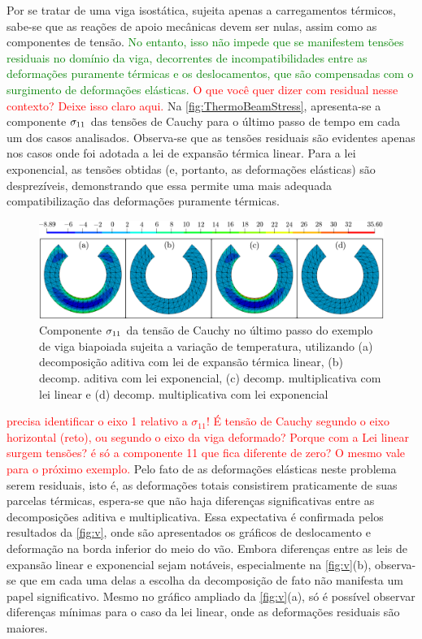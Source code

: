 \documentclass[Tese.tex]{subfiles}
\begin{document}
Por se tratar de uma viga isostática, sujeita apenas a carregamentos térmicos, sabe-se que as reações de apoio mecânicas devem ser nulas, assim como as componentes de tensão.\textcolor{green}{ No entanto, isso não impede que se manifestem tensões residuais no domínio da viga, decorrentes de incompatibilidades entre as deformações puramente térmicas e os deslocamentos, que são compensadas com o surgimento de deformações elásticas.} \textcolor{red}{O que você quer dizer com residual nesse contexto? Deixe isso claro aqui.}
Na \autoref{fig:ThermoBeamStress}, apresenta-se a componente ${\sigma}_{11}$ das tensões de Cauchy para o último passo de tempo em cada um dos casos analisados. Observa-se que as tensões residuais são evidentes apenas nos casos onde foi adotada a lei de expansão térmica linear. Para a lei exponencial, as tensões obtidas (e, portanto, as deformações elásticas) são desprezíveis, demonstrando que essa permite uma mais adequada compatibilização das deformações puramente térmicas.

\begin{figure}[!htb]
	\centering
	\caption{Componente ${\sigma}_{11}$ da tensão de Cauchy no último passo do exemplo de viga biapoiada sujeita a variação de temperatura, utilizando (a) decomposição aditiva com lei de expansão térmica linear, (b) decomp. aditiva com lei exponencial, (c) decomp. multiplicativa com lei linear e (d) decomp. multiplicativa com lei exponencial}
	\label{fig:ThermoBeamStress}
	\includegraphics[scale=0.39]{Figuras/ThermoBeam/ThermoBeamStress.png}
\end{figure}

\textcolor{red}{precisa identificar o eixo 1 relativo a $\sigma_{11}$! É tensão de Cauchy segundo o eixo horizontal (reto), ou segundo o eixo da viga deformado? Porque com a Lei linear surgem tensões? é só a componente 11 que fica diferente de zero? O mesmo vale para o próximo exemplo.}
Pelo fato de as deformações elásticas neste problema serem residuais, isto é, as deformações totais consistirem praticamente de suas parcelas térmicas, espera-se que não haja diferenças significativas entre as decomposições aditiva e multiplicativa. Essa expectativa é confirmada pelos resultados da \autoref{fig:v}, onde são apresentados os gráficos de deslocamento e deformação na borda inferior do meio do vão. Embora diferenças entre as leis de expansão linear e exponencial sejam notáveis, especialmente na \autoref{fig:v}(b), observa-se que em cada uma delas a escolha da decomposição de fato não manifesta um papel significativo. Mesmo no gráfico ampliado da \autoref{fig:v}(a), só é possível observar diferenças mínimas para o caso da lei linear, onde as deformações residuais são maiores.
\end{document}
